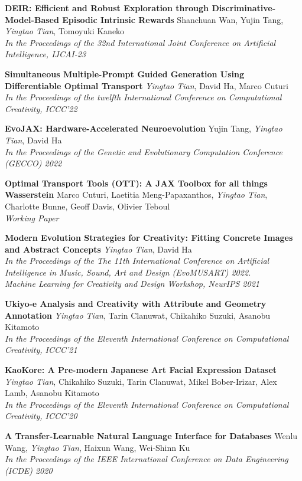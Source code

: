 \documentclass[line,margin]{cv}
\begin{document}
\begin{resume}
  {\bf DEIR: Efficient and Robust Exploration through Discriminative-Model-Based Episodic Intrinsic Rewards}
  Shanchuan Wan, Yujin Tang, \emph{Yingtao Tian}, Tomoyuki Kaneko\\
  \emph{In the Proceedings of the 32nd International Joint Conference on Artificial Intelligence, IJCAI-23}

  {\bf Simultaneous Multiple-Prompt Guided Generation Using Differentiable Optimal Transport}
  \emph{Yingtao Tian}, David Ha, Marco Cuturi\\
  \emph{In the Proceedings of the twelfth International Conference on Computational Creativity, ICCC'22}

  {\bf EvoJAX: Hardware-Accelerated Neuroevolution}
  Yujin Tang, \emph{Yingtao Tian}, David Ha\\
  \emph{In the Proceedings of the Genetic and Evolutionary Computation Conference (GECCO) 2022}

  {\bf Optimal Transport Tools (OTT): A JAX Toolbox for all things Wasserstein}
  Marco Cuturi, Laetitia Meng-Papaxanthos, \emph{Yingtao Tian}, Charlotte Bunne, Geoff Davis, Olivier Teboul\\
  \emph{Working Paper}

  {\bf Modern Evolution Strategies for Creativity: Fitting Concrete Images and Abstract Concepts}
  \emph{Yingtao Tian}, David Ha\\
  \emph{In the Proceedings of the The 11th International Conference on Artificial Intelligence in Music, Sound, Art and Design (EvoMUSART) 2022.\\
  Machine Learning for Creativity and Design Workshop, NeurIPS 2021}

  {\bf  Ukiyo-e Analysis and Creativity with Attribute and Geometry Annotation}
  \emph{Yingtao Tian}, Tarin Clanuwat, Chikahiko Suzuki, Asanobu Kitamoto\\
  \emph{In the Proceedings of the Eleventh International Conference on Computational Creativity, ICCC'21}

  {\bf  KaoKore: A Pre-modern Japanese Art Facial Expression Dataset}
  \emph{Yingtao Tian}, Chikahiko Suzuki, Tarin Clanuwat, Mikel Bober-Irizar, Alex Lamb, Asanobu Kitamoto\\
  \emph{In the Proceedings of the Eleventh International Conference on Computational Creativity, ICCC'20}

  {\bf  A Transfer-Learnable Natural Language Interface for Databases}
  Wenlu Wang, \emph{Yingtao Tian}, Haixun Wang, Wei-Shinn Ku\\
  \emph{In the Proceedings of the IEEE International Conference on Data Engineering (ICDE) 2020}
  

\end{resume}
\end{document}
